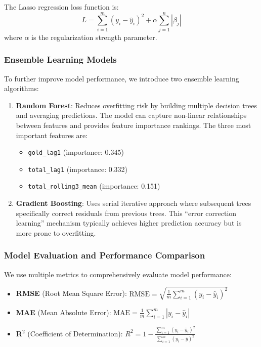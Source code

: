 \documentclass{mcmthesis}
\begin{document}
The Lasso regression loss function is:
\begin{equation}
    L = \sum_{i=1}^{m}(y_i - \hat{y}_i)^2 + \alpha \sum_{j=1}^{n}|\beta_j|
\end{equation}
where $\alpha$ is the regularization strength parameter.

\subsubsection{Ensemble Learning Models}

To further improve model performance, we introduce two ensemble learning algorithms:

\begin{enumerate}
    \item \textbf{Random Forest}: Reduces overfitting risk by building multiple decision trees and averaging predictions. The model can capture non-linear relationships between features and provides feature importance rankings. The three most important features are:
    \begin{itemize}
        \item \texttt{gold\_lag1} (importance: 0.345)
        \item \texttt{total\_lag1} (importance: 0.332)
        \item \texttt{total\_rolling3\_mean} (importance: 0.151)
    \end{itemize}
    
    \item \textbf{Gradient Boosting}: Uses serial iterative approach where subsequent trees specifically correct residuals from previous trees. This ``error correction learning'' mechanism typically achieves higher prediction accuracy but is more prone to overfitting.
\end{enumerate}

\subsubsection{Model Evaluation and Performance Comparison}

We use multiple metrics to comprehensively evaluate model performance:
\begin{itemize}
    \item \textbf{RMSE} (Root Mean Square Error): $\text{RMSE} = \sqrt{\frac{1}{m}\sum_{i=1}^{m}(y_i - \hat{y}_i)^2}$
    \item \textbf{MAE} (Mean Absolute Error): $\text{MAE} = \frac{1}{m}\sum_{i=1}^{m}|y_i - \hat{y}_i|$
    \item \textbf{R$^2$} (Coefficient of Determination): $R^2 = 1 - \frac{\sum_{i=1}^{m}(y_i - \hat{y}_i)^2}{\sum_{i=1}^{m}(y_i - \bar{y})^2}$
\end{itemize}
\end{document}
